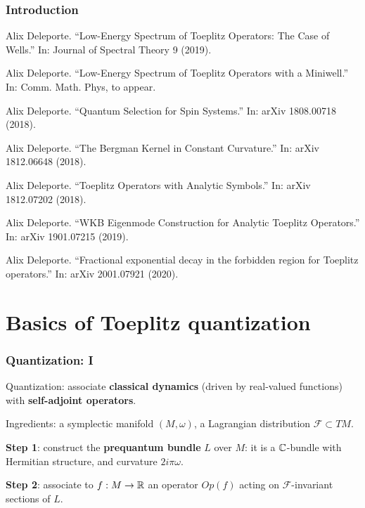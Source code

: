 \documentclass[mathserif]{beamer}
\begin{document}
      \begin{frame}
        \frametitle{Introduction}
        {\footnotesize
        \begin{description}
        \item<1>[{[D. 2019]}] Alix Deleporte. “Low-Energy Spectrum of Toeplitz Operators: The Case
of Wells.” In: Journal of Spectral Theory 9 (2019).
\item<1-2> [{[D. 2020?]}] Alix Deleporte. “Low-Energy Spectrum of Toeplitz Operators with a
Miniwell.” In: Comm. Math. Phys, to appear.
\item<1>[{[D. 2018a++]}] Alix Deleporte. “Quantum Selection for Spin Systems.” In: arXiv
1808.00718 (2018).
\item<1>[{[D. 2018b++]}] Alix Deleporte. “The Bergman Kernel in Constant Curvature.” In:
arXiv 1812.06648 (2018).
\item<1-2>[{[D. 2018c++]}] Alix Deleporte. “Toeplitz Operators with Analytic Symbols.” In: arXiv
1812.07202 (2018).
\item<1>[{[D. 2019++]}] Alix Deleporte. “WKB Eigenmode Construction for Analytic Toeplitz
  Operators.” In: arXiv 1901.07215 (2019).
  \item<1-2>[{[D. 2020++]}] Alix Deleporte. ``Fractional exponential
    decay in the forbidden region for Toeplitz operators.'' In: arXiv
    2001.07921 (2020).
  
        \end{description}}
      \end{frame}

      

\section{Basics of Toeplitz quantization}
\begin{frame}
  \frametitle{Quantization: I}
  Quantization: associate {\bf classical dynamics} (driven by
  real-valued functions) with {\bf self-adjoint operators}.

Ingredients: a symplectic manifold $(M,\omega)$, a Lagrangian
distribution $\mathcal{F}\subset TM$.

\vfill

{\bfseries Step 1}: construct the {\bfseries prequantum bundle} $L$
over $M$: it is a $\mathbb{C}$-bundle with Hermitian structure, and curvature
$2i\pi \omega$.

{\bfseries Step 2}: associate to $f:M\to \mathbb{R}$ an operator $Op(f)$
acting on $\mathcal{F}$-invariant sections of $L$.
\end{frame}
\end{document}
